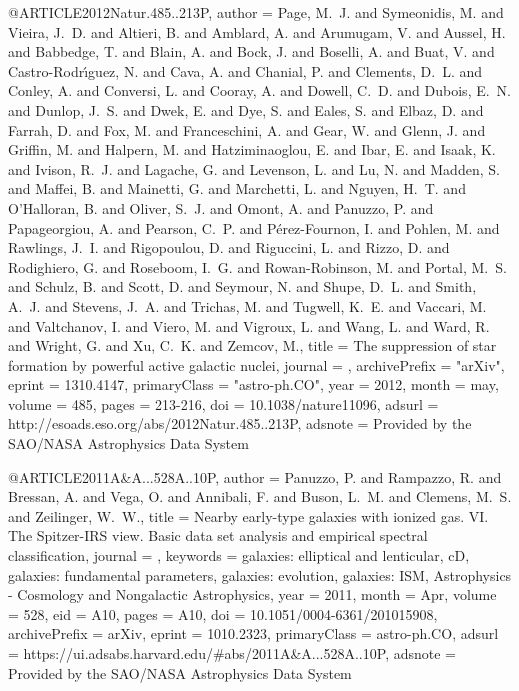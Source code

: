 \documentclass[longauth]{aa}
\begin{document}
{{{@ARTICLE{2012Natur.485..213P,
   author = {{Page}, M.~J. and {Symeonidis}, M. and {Vieira}, J.~D. and {Altieri}, B. and {Amblard}, A. and {Arumugam}, V. and {Aussel}, H. and {Babbedge}, T. and {Blain}, A. and {Bock}, J. and {Boselli}, A. and {Buat}, V. and {Castro-Rodr{\'{\i}}guez}, N. and {Cava}, A. and {Chanial}, P. and {Clements}, D.~L. and {Conley}, A. and {Conversi}, L. and {Cooray}, A. and {Dowell}, C.~D. and {Dubois}, E.~N. and {Dunlop}, J.~S. and {Dwek}, E. and {Dye}, S. and {Eales}, S. and {Elbaz}, D. and {Farrah}, D. and {Fox}, M. and {Franceschini}, A. and {Gear}, W. and {Glenn}, J. and {Griffin}, M. and {Halpern}, M. and {Hatziminaoglou}, E. and {Ibar}, E. and {Isaak}, K. and {Ivison}, R.~J. and {Lagache}, G. and {Levenson}, L. and {Lu}, N. and {Madden}, S. and {Maffei}, B. and {Mainetti}, G. and {Marchetti}, L. and {Nguyen}, H.~T. and {O'Halloran}, B. and {Oliver}, S.~J. and {Omont}, A. and {Panuzzo}, P. and {Papageorgiou}, A. and {Pearson}, C.~P. and {P{\'e}rez-Fournon}, I. and {Pohlen}, M. and {Rawlings}, J.~I. and {Rigopoulou}, D. and {Riguccini}, L. and {Rizzo}, D. and {Rodighiero}, G. and {Roseboom}, I.~G. and {Rowan-Robinson}, M. and {Portal}, M.~S. and {Schulz}, B. and {Scott}, D. and {Seymour}, N. and {Shupe}, D.~L. and {Smith}, A.~J. and {Stevens}, J.~A. and {Trichas}, M. and {Tugwell}, K.~E. and {Vaccari}, M. and {Valtchanov}, I. and	{Viero}, M. and {Vigroux}, L. and {Wang}, L. and {Ward}, R. and {Wright}, G. and {Xu}, C.~K. and {Zemcov}, M.},
    title = {The suppression of star formation by powerful active galactic nuclei},
  journal = {\nat},
archivePrefix = "arXiv",
   eprint = {1310.4147},
 primaryClass = "astro-ph.CO",
     year = 2012,
    month = may,
   volume = 485,
    pages = {213-216},
      doi = {10.1038/nature11096},
   adsurl = {http://esoads.eso.org/abs/2012Natur.485..213P},
  adsnote = {Provided by the SAO/NASA Astrophysics Data System}
}

@ARTICLE{2011A&A...528A..10P,
       author = {{Panuzzo}, P. and {Rampazzo}, R. and {Bressan}, A. and {Vega}, O. and {Annibali}, F. and {Buson}, L.~M. and {Clemens}, M.~S. and {Zeilinger}, W.~W.},
        title = {Nearby early-type galaxies with ionized gas. VI. The Spitzer-IRS view. Basic data set analysis and empirical spectral classification},
      journal = {\aap},
     keywords = {galaxies: elliptical and lenticular, cD, galaxies: fundamental
        parameters, galaxies: evolution, galaxies: ISM, Astrophysics - Cosmology and Nongalactic Astrophysics},
         year = 2011,
        month = Apr,
       volume = {528},
          eid = {A10},
        pages = {A10},
          doi = {10.1051/0004-6361/201015908},
archivePrefix = {arXiv},
       eprint = {1010.2323},
 primaryClass = {astro-ph.CO},
       adsurl = {https://ui.adsabs.harvard.edu/#abs/2011A&A...528A..10P},
      adsnote = {Provided by the SAO/NASA Astrophysics Data System}
}

}}}
\end{document}
